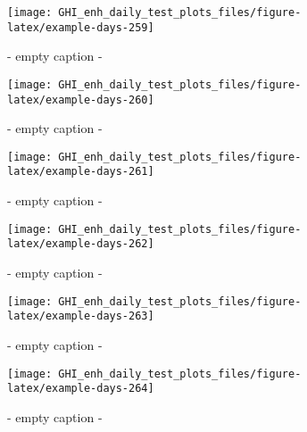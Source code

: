 \documentclass[
  10pt,
  a4paper,oneside]{article}
\begin{document}
\begin{figure}[H]

{\centering \texttt{[image: GHI\_enh\_daily\_test\_plots\_files/figure-latex/example-days-259]} 

}

\caption{ - empty caption - }\label{fig:example-days-259}
\end{figure}

\begin{figure}[H]

{\centering \texttt{[image: GHI\_enh\_daily\_test\_plots\_files/figure-latex/example-days-260]} 

}

\caption{ - empty caption - }\label{fig:example-days-260}
\end{figure}

\begin{figure}[H]

{\centering \texttt{[image: GHI\_enh\_daily\_test\_plots\_files/figure-latex/example-days-261]} 

}

\caption{ - empty caption - }\label{fig:example-days-261}
\end{figure}

\begin{figure}[H]

{\centering \texttt{[image: GHI\_enh\_daily\_test\_plots\_files/figure-latex/example-days-262]} 

}

\caption{ - empty caption - }\label{fig:example-days-262}
\end{figure}

\begin{figure}[H]

{\centering \texttt{[image: GHI\_enh\_daily\_test\_plots\_files/figure-latex/example-days-263]} 

}

\caption{ - empty caption - }\label{fig:example-days-263}
\end{figure}

\begin{figure}[H]

{\centering \texttt{[image: GHI\_enh\_daily\_test\_plots\_files/figure-latex/example-days-264]} 

}

\caption{ - empty caption - }\label{fig:example-days-264}
\end{figure}
\end{document}
